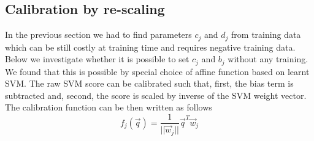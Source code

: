     	
%
%

   \subsection{Calibration by re-scaling}

      In the previous section we had to find parameters $c_j$ and $d_j$ from training data which can be still costly at training time and requires negative training data. Below we investigate whether it is possible to set $c_j$ and $b_j$ without any training. We found that this is possible by special choice of affine function based on learnt SVM. 
      The raw SVM score can be calibrated such that, first, the bias term is subtracted and, second, the score is scaled by inverse of the SVM weight vector. The calibration function can be then written as follows
      \begin{equation}
         f_j(\vec{q}) = \dfrac{1}{||\vec{w}_j||}\vec{q}^T\vec{w}_j
         \label{eq:rescale}
      \end{equation}

